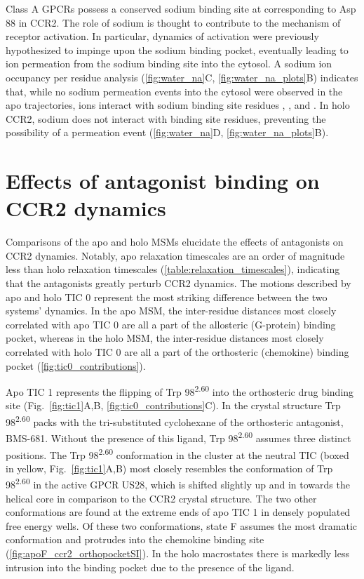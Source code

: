 Class A GPCRs possess a conserved sodium binding site at  corresponding to Asp 88 in CCR2\cite{Katritch2014}.
The role of sodium is thought to contribute to the mechanism of receptor activation\cite{Yuan2013,Vickery2018,Miao2015}. In particular, dynamics of activation were previously hypothesized to impinge upon the sodium binding pocket, eventually leading to ion permeation from the sodium binding site into the cytosol\cite{Vickery2018}.
A sodium ion occupancy per residue analysis (\ref{fig:water_na}C, \cref{fig:water_na_plots}B) indicates that, while no sodium permeation events into the cytosol were observed in the apo trajectories, ions interact with sodium binding site residues , , and .
In holo CCR2, sodium does not interact with binding site residues, preventing the possibility of a permeation event (\ref{fig:water_na}D, \cref{fig:water_na_plots}B).

\section{Effects of antagonist binding on CCR2 dynamics}

Comparisons of the apo and holo MSMs elucidate the effects of antagonists on CCR2 dynamics.
Notably, apo relaxation timescales are an order of magnitude less than holo relaxation timescales (\cref{table:relaxation_timescales}), indicating that the antagonists greatly perturb CCR2 dynamics.
The motions described by apo and holo TIC 0 represent the most striking difference between the two systems' dynamics.
In the apo MSM, the inter-residue distances most closely correlated with apo TIC 0 are all a part of the allosteric (G-protein) binding pocket, whereas in the holo MSM, the inter-residue distances most closely correlated with holo TIC 0 are all a part of the orthosteric (chemokine) binding pocket (\cref{fig:tic0_contributions}).

Apo TIC 1 represents the flipping of Trp 98\textsuperscript{2.60} into the orthosteric drug binding site (Fig.~\ref{fig:tic1}A,B, \ref{fig:tic0_contributions}C).
In the crystal structure Trp 98\textsuperscript{2.60} packs with the tri-substituted cyclohexane of the orthosteric antagonist, BMS-681\cite{Zheng2016}.
Without the presence of this ligand, Trp 98\textsuperscript{2.60} assumes three distinct positions.
The Trp 98\textsuperscript{2.60} conformation in the cluster at the neutral TIC (boxed in yellow, Fig.~\ref{fig:tic1}A,B) most closely resembles the conformation of Trp 98\textsuperscript{2.60} in the active GPCR US28, which is shifted slightly up and in towards the helical core in comparison to the CCR2 crystal structure.
The two other conformations are found at the extreme ends of apo TIC 1 in densely populated free energy wells.
Of these two conformations, state F assumes the most dramatic conformation and protrudes into the chemokine binding site (\cref{fig:apoF_ccr2_orthopocketSI}).
In the holo macrostates there is markedly less intrusion into the binding pocket due to the presence of the ligand.

